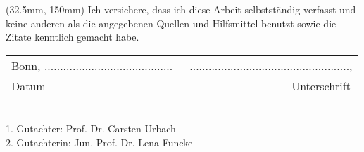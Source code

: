 \documentclass[sn-mathphys-num,iicol]{sn-jnl}
\theoremstyle{thmstyleone}
\theoremstyle{thmstyletwo}
\theoremstyle{thmstylethree}
\begin{document}
\clearpage
\begin{textblock*}{140mm}(32.5mm, 150mm)
	Ich versichere, dass ich diese Arbeit selbstständig verfasst und keine anderen als die angegebenen Quellen und Hilfsmittel benutzt sowie die Zitate kenntlich gemacht habe.\\[40pt]
	\begin{center}
		\begin{tabular}{lr}
			Bonn, ......................................... \hspace{3cm}\, & ..................................................., \\
			\hspace{2cm}Datum                                              & Unterschrift\hspace{1.5cm}\,
		\end{tabular}
	\end{center}
	\,\\[20pt]
	1. Gutachter: Prof. Dr. Carsten Urbach \\
	2. Gutachterin: Jun.-Prof. Dr. Lena Funcke
\end{textblock*}
\end{document}
